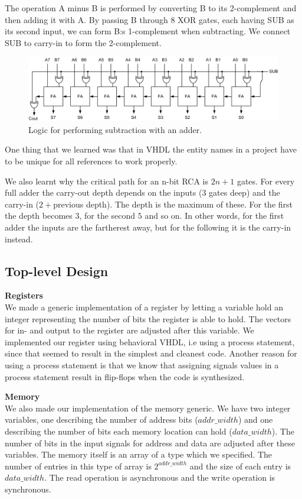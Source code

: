 \documentclass[a4paper,11pt]{article}
\begin{document}
The operation A minus B is performed by converting B to its 2-complement and then adding it with A. By passing B through 8 XOR gates, each having SUB as its second input, we can form B:s 1-complement when subtracting. We connect SUB to carry-in to form the 2-complement.

\begin{figure}[h!]
  \centering
  \includegraphics[width=0.90\linewidth]{subtractionlogic.jpg}
  \caption{Logic for performing subtraction with an adder.}
  \label{fig:etikett}
\end{figure}

One thing that we learned was that in VHDL the entity names in a project have to be unique for all references to work properly. 

We also learnt why the critical path for an n-bit RCA is $2n+1$ gates. For every full adder the carry-out depth depends on the inputs ($3$ gates deep) and the carry-in ($2 + $previous depth). The depth is the maximum of these. For the first the depth becomes $3$, for the second $5$ and so on. In other words, for the first adder the inputs are the fartherest away, but for the following it is the carry-in instead. 

\newpage
\subsection{Top-level Design}
\textbf{Registers}\\
We made a generic implementation of a register by letting a variable hold an integer representing the number of bits the register is able to hold. The vectors for in- and output to the register are adjusted after this variable. We implemented our register using behavioral VHDL, i.e using a process statement, since that seemed to result in the simplest and cleanest code. Another reason for using a process statement is that we know that assigning signals values in a process statement result in flip-flops when the code is synthesized.

\textbf{Memory}\\
We also made our implementation of the memory generic. We have two integer variables, one describing the number of address bits ($addr\_width$) and one describing the number of bits each memory location can hold ($data\_width$). The number of bits in the input signals for address and data are adjusted after these variables. The memory itself is an array of a type which we specified. The number of entries in this type of array is $2^{addr\_width}$ and the size of each entry is $data\_width$. The read operation is asynchronous and the write operation is synchronous.
\end{document}
